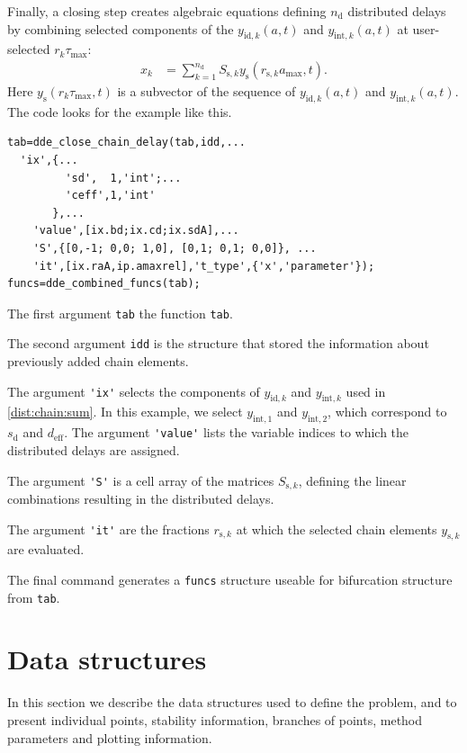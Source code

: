 \documentclass[10pt]{scrartcl}
\newcommand{\blist}[1]{\mbox{\lstinline!#1!}}
\begin{document}
Finally, a closing step creates algebraic equations defining
$n_\mathrm{d}$ distributed delays by combining selected components of
the $y_{\mathrm{id},k}(a,t)$ and $y_{\mathrm{int},k}(a,t)$ at
user-selected $r_k\tau_{\max}$:
\begin{align}\label{dist:chain:sum}
  x_k&=\sum_{k=1}^{n_\mathrm{d}}S_{\mathrm{s},k}y_\mathrm{s}(r_{\mathrm{s},k}a_{\max},t).
\end{align}
Here $y_\mathrm{s}(r_k\tau_{\max},t)$ is a subvector of the sequence
of $y_{\mathrm{id},k}(a,t)$ and $y_{\mathrm{int},k}(a,t)$. 
The code looks for the example like this.
\begin{lstlisting}
tab=dde_close_chain_delay(tab,idd,...
  'ix',{...
         'sd',  1,'int';...
         'ceff',1,'int'
       },...
    'value',[ix.bd;ix.cd;ix.sdA],...
    'S',{[0,-1; 0,0; 1,0], [0,1; 0,1; 0,0]}, ...
    'it',[ix.raA,ip.amaxrel],'t_type',{'x','parameter'});
funcs=dde_combined_funcs(tab);  
\end{lstlisting}
\begin{compactitem}
\item 
The first argument \blist{tab} the function \blist{tab}. 
\item The second
argument \blist{idd} is the structure that stored the information
about previously added chain elements. 
\item The argument \blist{'ix'}
selects the components of $y_{\mathrm{id},k}$ and $y_{\mathrm{int},k}$
used in \eqref{dist:chain:sum}. In this example, we select
$y_{\mathrm{int},1}$ and $y_{\mathrm{int},2}$, which correspond to
$s_\mathrm{d}$ and $d_\mathrm{eff}$. The argument \blist{'value'}
lists the variable indices to which the distributed delays are
assigned.
\item The argument \blist{'S'} is a cell array of the matrices
$S_{\mathrm{s},k}$, defining the linear combinations resulting in the
distributed delays. 
\item The argument \blist{'it'} are the fractions $r_{\mathrm{s},k}$
  at which the selected chain elements $y_{\mathrm{s},k}$ are evaluated.
\end{compactitem}
The final command generates a \blist{funcs} structure useable for
bifurcation structure from \blist{tab}.
\section{Data structures}\label{data_structures}

In this section we describe the data structures used to define the
problem, and to present individual points, stability information, branches
of points, method parameters and plotting information.
\end{document}
